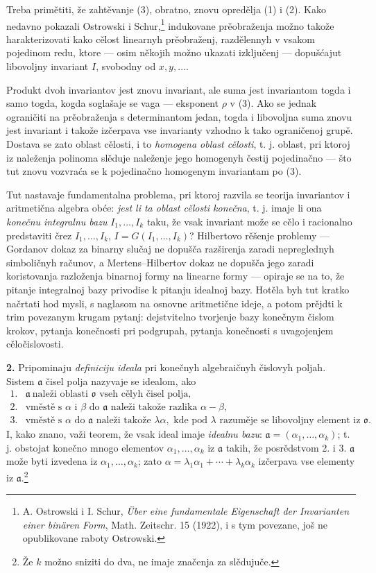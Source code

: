 \documentclass[11pt]{article}
\providecommand{\mo}{\mathfrak o}
\providecommand{\ma}{\mathfrak a}
\begin{document}
Treba primětiti, že zahtěvanje (3), obratno, znovu opredělja (1) i (2). Kako nedavno pokazali Ostrowski i Schur,\footnote{A. Ostrowski i I. Schur, \emph{Über eine fundamentale Eigenschaft der Invarianten einer binären Form}, Math. Zeitschr. 15 (1922), i s tym povezane, još ne opublikovane raboty Ostrowski.} indukovane prěobraženja možno takože harakterizovati kako cělost linearnyh prěobraženj, razdělennyh v vsakom pojedinom redu, ktore --- osim někojih možno ukazati izključenj --- dopušćajut libovoljny invariant $I$, svobodny od $x,y,\ldots$.

Produkt dvoh invariantov jest znovu invariant, ale suma jest invariantom togda i samo togda, kogda soglašaje se vaga --- eksponent $\rho$ v (3). Ako se jednak ograničiti na prěobraženja s determinantom jedan, togda i libovoljna suma znovu jest invariant i takože izčerpava vse invarianty vzhodno k tako ograničenoj grupě. Dostava se zato oblast cělosti, i to \emph{homogena oblast cělosti}, t. j. oblast, pri ktoroj iz naleženja polinoma slěduje naleženje jego homogenyh čestij pojedinačno --- što tut znovu vozvraća se k pojedinačno homogenym invariantam po (3).

Tut nastavaje fundamentalna problema, pri ktoroj razvila se teorija invariantov i aritmetična algebra obće: \emph{jest li ta oblast cělosti konečna}, t. j. imaje li ona \emph{konečnu integralnu bazu} $I_1,\ldots,I_k$ taku, že vsak invariant može se cělo i racionalno predstaviti črez $I_1,\ldots,I_k$, $I=G(I_1,\ldots,I_k)$? Hilbertovo rěšenje problemy --- Gordanov dokaz za binarny slučaj ne dopušča razširenja zaradi nepreglednyh simboličnyh računov, a Mertens--Hilbertov dokaz ne dopušča jego zaradi koristovanja razloženja binarnoj formy na linearne formy --- opiraje se na to, že pitanje integralnoj bazy privodise k pitanju idealnoj bazy. Hotěla byh tut kratko načrtati hod mysli, s naglasom na osnovne aritmetične ideje, a potom prějdti k trim povezanym krugam pytanj: dejstvitelno tvorjenje bazy konečnym čislom krokov, pytanja konečnosti pri podgrupah, pytanja konečnosti s uvagojenjem cěločislovosti.

\textbf{2.} Pripominaju \emph{definiciju ideala} pri konečnyh algebraičnyh čislovyh poljah. Sistem $\ma$ čisel polja nazyvaje se idealom, ako
\[
\begin{array}{ll}
1.& \ma\ \text{naleži oblasti }\mo\text{ vseh cělyh čisel polja},\\
2.& \text{vměstě s }\alpha\text{ i }\beta\text{ do }\ma\text{ naleži takože razlika }\alpha-\beta,\\
3.& \text{vměstě s }\alpha\text{ do }\ma\text{ naleži takože }\lambda\alpha,\text{ kde pod }\lambda
\text{ razuměje se libovoljny element iz }\mo.
\end{array}
\]
I, kako znano, važi teorem, že vsak ideal imaje \emph{idealnu bazu}: $\ma=(\alpha_1,\ldots,\alpha_k)$; t. j. obstojat konečno mnogo elementov $\alpha_1,\ldots,\alpha_k$ iz $\ma$ takih, že posrědstvom 2. i 3. $\ma$ može byti izvedena iz $\alpha_1,\ldots,\alpha_k$; zato $\alpha=\lambda_1\alpha_1+\cdots+\lambda_k\alpha_k$ izčerpava vse elementy iz $\ma$.\footnote{Že $k$ možno sniziti do dva, ne imaje značenja za slědujuče.}
\end{document}
